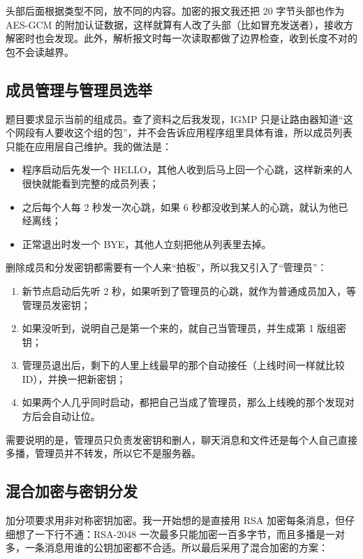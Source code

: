\documentclass[a4paper,zihao=-4]{ctexart}
\begin{document}
头部后面根据类型不同，放不同的内容。加密的报文我还把 20 字节头部也作为 AES-GCM 的附加认证数据，这样就算有人改了头部（比如冒充发送者），接收方解密时也会发现。此外，解析报文时每一次读取都做了边界检查，收到长度不对的包不会读越界。

\subsection{成员管理与管理员选举}

题目要求显示当前的组成员。查了资料之后我发现，IGMP 只是让路由器知道“这个网段有人要收这个组的包”，并不会告诉应用程序组里具体有谁，所以成员列表只能在应用层自己维护。我的做法是：

\begin{itemize}
  \item 程序启动后先发一个 HELLO，其他人收到后马上回一个心跳，这样新来的人很快就能看到完整的成员列表；
  \item 之后每个人每 2 秒发一次心跳，如果 6 秒都没收到某人的心跳，就认为他已经离线；
  \item 正常退出时发一个 BYE，其他人立刻把他从列表里去掉。
\end{itemize}

删除成员和分发密钥都需要有一个人来“拍板”，所以我又引入了“管理员”：

\begin{enumerate}
  \item 新节点启动后先听 2 秒，如果听到了管理员的心跳，就作为普通成员加入，等管理员发密钥；
  \item 如果没听到，说明自己是第一个来的，就自己当管理员，并生成第 1 版组密钥；
  \item 管理员退出后，剩下的人里上线最早的那个自动接任（上线时间一样就比较 ID），并换一把新密钥；
  \item 如果两个人几乎同时启动，都把自己当成了管理员，那么上线晚的那个发现对方后会自动让位。
\end{enumerate}

需要说明的是，管理员只负责发密钥和删人，聊天消息和文件还是每个人自己直接多播，管理员并不转发，所以它不是服务器。

\subsection{混合加密与密钥分发}

加分项要求用非对称密钥加密。我一开始想的是直接用 RSA 加密每条消息，但仔细想了一下行不通：RSA-2048 一次最多只能加密一百多字节，而且多播是一对多，一条消息用谁的公钥加密都不合适。所以最后采用了混合加密的方案：
\end{document}
